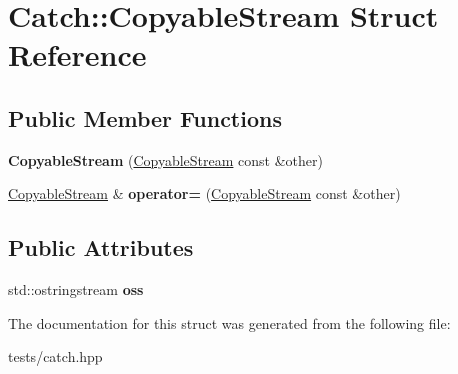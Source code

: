 \hypertarget{struct_catch_1_1_copyable_stream}{}\section{Catch\+:\+:Copyable\+Stream Struct Reference}
\label{struct_catch_1_1_copyable_stream}
\subsection*{Public Member Functions}
\begin{DoxyCompactItemize}
\item 
\mbox{\label{struct_catch_1_1_copyable_stream_a0e72dc16240653f52c17106f4bf34da8}} 
{\bfseries Copyable\+Stream} (\hyperlink{struct_catch_1_1_copyable_stream}{Copyable\+Stream} const \&other)
\item 
\mbox{\label{struct_catch_1_1_copyable_stream_a1760fa29b38011c5845171260bec0966}} 
\hyperlink{struct_catch_1_1_copyable_stream}{Copyable\+Stream} \& {\bfseries operator=} (\hyperlink{struct_catch_1_1_copyable_stream}{Copyable\+Stream} const \&other)
\end{DoxyCompactItemize}
\subsection*{Public Attributes}
\begin{DoxyCompactItemize}
\item 
\mbox{\label{struct_catch_1_1_copyable_stream_ae123fb4d673e7d7a13a3c5f6bc5d426c}} 
std\+::ostringstream {\bfseries oss}
\end{DoxyCompactItemize}


The documentation for this struct was generated from the following file\+:\begin{DoxyCompactItemize}
\item 
tests/catch.\+hpp\end{DoxyCompactItemize}
